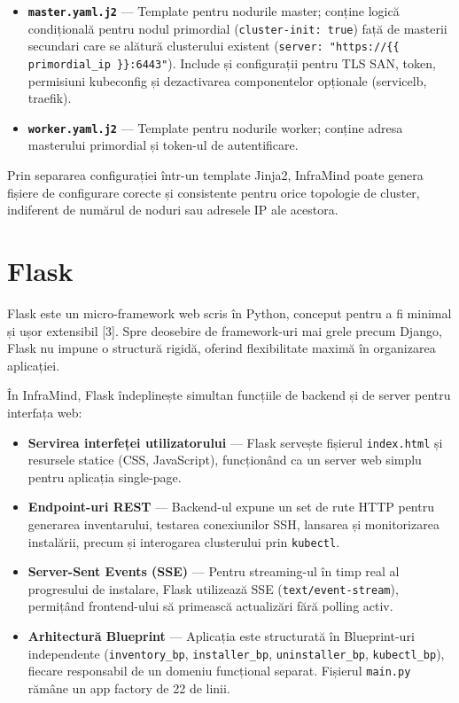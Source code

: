\documentclass[12pt,a4paper]{report}
\begin{document}
\begin{itemize}
  \item \textbf{\texttt{master.yaml.j2}} — Template pentru nodurile master; conține logică condițională pentru nodul primordial (\texttt{cluster-init: true}) față de masterii secundari care se alătură clusterului existent (\texttt{server: "https://\{\{ primordial\_ip \}\}:6443"}). Include și configurații pentru TLS SAN, token, permisiuni kubeconfig și dezactivarea componentelor opționale (servicelb, traefik).
  \item \textbf{\texttt{worker.yaml.j2}} — Template pentru nodurile worker; conține adresa masterului primordial și token-ul de autentificare.
\end{itemize}

Prin separarea configurației într-un template Jinja2, InfraMind poate genera fișiere de configurare corecte și consistente pentru orice topologie de cluster, indiferent de numărul de noduri sau adresele IP ale acestora.

\section{Flask}

Flask este un micro-framework web scris în Python, conceput pentru a fi minimal și ușor extensibil [3]. Spre deosebire de framework-uri mai grele precum Django, Flask nu impune o structură rigidă, oferind flexibilitate maximă în organizarea aplicației.

În InfraMind, Flask îndeplinește simultan funcțiile de backend și de server pentru interfața web:

\begin{itemize}
  \item \textbf{Servirea interfeței utilizatorului} — Flask servește fișierul \texttt{index.html} și resursele statice (CSS, JavaScript), funcționând ca un server web simplu pentru aplicația single-page.
  \item \textbf{Endpoint-uri REST} — Backend-ul expune un set de rute HTTP pentru generarea inventarului, testarea conexiunilor SSH, lansarea și monitorizarea instalării, precum și interogarea clusterului prin \texttt{kubectl}.
  \item \textbf{Server-Sent Events (SSE)} — Pentru streaming-ul în timp real al progresului de instalare, Flask utilizează SSE (\texttt{text/event-stream}), permițând frontend-ului să primească actualizări fără polling activ.
  \item \textbf{Arhitectură Blueprint} — Aplicația este structurată în Blueprint-uri independente (\texttt{inventory\_bp}, \texttt{installer\_bp}, \texttt{uninstaller\_bp}, \texttt{kubectl\_bp}), fiecare responsabil de un domeniu funcțional separat. Fișierul \texttt{main.py} rămâne un app factory de 22 de linii.
\end{itemize}
\end{document}
